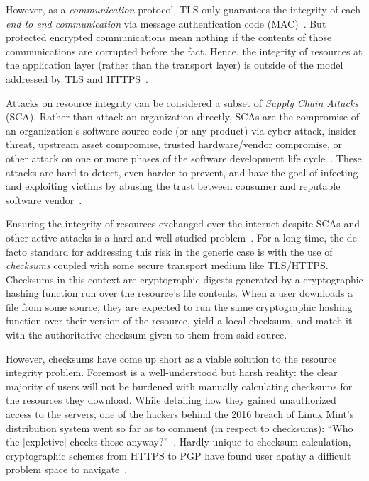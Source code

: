 However, as a \textit{communication} protocol, TLS only guarantees the integrity
of each \textit{end to end communication} via message authentication code
(MAC)~\cite{TLS1.2}. But protected encrypted communications mean nothing if the
contents of those communications are corrupted before the fact. Hence, the
integrity of resources at the application layer (rather than the transport
layer) is outside of the model addressed by TLS and HTTPS~\cite{TLS1.2, HTTPS}.

Attacks on resource integrity can be considered a subset of \emph{Supply Chain
Attacks} (SCA). Rather than attack an organization directly, SCAs are the
compromise of an organization's software source code (or any product) via cyber
attack, insider threat, upstream asset compromise, trusted hardware/vendor
compromise, or other attack on one or more phases of the software development
life cycle~\cite{NIST-SCA}. These attacks are hard to detect, even harder to
prevent, and have the goal of infecting and exploiting victims by abusing the
trust between consumer and reputable software vendor~\cite{SCA}.

Ensuring the integrity of resources exchanged over the internet despite SCAs and
other active attacks is a hard and well studied problem~\cite{MD5Header,
HTTP1.1, HTTPS, SRI, LF, OpenPGP1, DNSSEC, PKI}. For a long time, the de facto
standard for addressing this risk in the generic case is with the use of
\textit{checksums} coupled with some secure transport medium like TLS/HTTPS.
Checksums in this context are cryptographic digests generated by a cryptographic
hashing function run over the resource's file contents. When a user downloads a
file from some source, they are expected to run the same cryptographic hashing
function over their version of the resource, yield a local checksum, and match
it with the authoritative checksum given to them from said source.

However, checksums have come up short as a viable solution to the resource
integrity problem. Foremost is a well-understood but harsh reality: the clear
majority of users will not be burdened with manually calculating checksums for
the resources they download. While detailing how they gained unauthorized access
to the servers, one of the hackers behind the 2016 breach of Linux Mint's
distribution system went so far as to comment (in respect to checksums): ``Who
the [expletive] checks those anyway?''~\cite{SCA-MINT3}. Hardly unique to
checksum calculation, cryptographic schemes from HTTPS to PGP have found user
apathy a difficult problem space to navigate~\cite{PGPBad, Clickthrough}.

